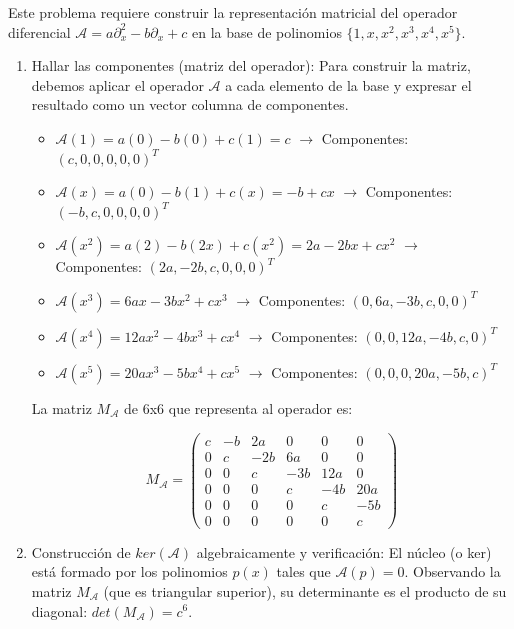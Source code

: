 \documentclass[11pt,spanish]{article}
\newcounter{problema}
\begin{document}
Este problema requiere construir la representación matricial del operador diferencial $\mathcal{A} = a\partial_{x}^{2} - b\partial_{x} + c$ en la base de polinomios $\{1, x, x^{2}, x^{3}, x^{4}, x^{5}\}$.

\begin{enumerate}
\item Hallar las componentes (matriz del operador):
Para construir la matriz, debemos aplicar el operador $\mathcal{A}$ a cada elemento de la base y expresar el resultado como un vector columna de componentes.
\begin{itemize}
\item $\mathcal{A}(1) = a(0) - b(0) + c(1) = c$  $\rightarrow$ Componentes: $(c, 0, 0, 0, 0, 0)^{T}$
\item $\mathcal{A}(x) = a(0) - b(1) + c(x) = -b + cx$ $\rightarrow$ Componentes: $(-b, c, 0, 0, 0, 0)^{T}$
\item $\mathcal{A}(x^{2}) = a(2) - b(2x) + c(x^{2}) = 2a - 2bx + cx^{2}$ $\rightarrow$ Componentes: $(2a, -2b, c, 0, 0, 0)^{T}$
\item $\mathcal{A}(x^{3}) = 6ax - 3bx^{2} + cx^{3}$ $\rightarrow$ Componentes: $(0, 6a, -3b, c, 0, 0)^{T}$
\item $\mathcal{A}(x^{4}) = 12ax^{2} - 4bx^{3} + cx^{4}$ $\rightarrow$ Componentes: $(0, 0, 12a, -4b, c, 0)^{T}$
\item $\mathcal{A}(x^{5}) = 20ax^{3} - 5bx^{4} + cx^{5}$ $\rightarrow$ Componentes: $(0, 0, 0, 20a, -5b, c)^{T}$
\end{itemize}

La matriz $M_{\mathcal{A}}$ de 6x6 que representa al operador es:

$$M_{\mathcal{A}} = \begin{pmatrix} c & -b & 2a & 0 & 0 & 0 \\ 0 & c & -2b & 6a & 0 & 0 \\ 0 & 0 & c & -3b & 12a & 0 \\ 0 & 0 & 0 & c & -4b & 20a \\ 0 & 0 & 0 & 0 & c & -5b \\ 0 & 0 & 0 & 0 & 0 & c \end{pmatrix}$$

\item Construcción de $ker(\mathcal{A})$ algebraicamente y verificación: 
El núcleo (o ker) está formado por los polinomios $p(x)$ tales que $\mathcal{A}(p) = 0$. Observando la matriz $M_{\mathcal{A}}$ (que es triangular superior), su determinante es el producto de su diagonal: $det(M_{\mathcal{A}}) = c^{6}$.


\end{enumerate}
\end{document}
